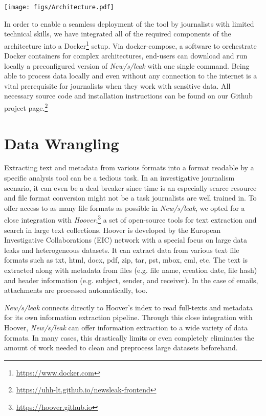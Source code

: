 \documentclass[11pt,a4paper]{article}
\begin{document}
    \begin{figure*}
    \centering
	\texttt{[image: figs/Architecture.pdf]}
	\caption{Architecture of \emph{New/s/leak 2.0}}
	\label{fig:arch} 
	\end{figure*}
	
In order to enable a seamless deployment of the tool by journalists with limited technical skills, we have integrated all of the required components of the architecture into a Docker\footnote{\url{https://www.docker.com}} setup. Via docker-compose, a software to orchestrate Docker containers for complex architectures, end-users can download and run locally a preconfigured version of \emph{New/s/leak} with one single command. Being able to process data locally and even without any connection to the internet is a vital prerequisite for journalists when they work with sensitive data. All necessary source code and installation instructions can be found on our Github project page.\footnote{\url{https://uhh-lt.github.io/newsleak-frontend}}


\section{Data Wrangling}
\label{sec:data_wrangling}

Extracting text and metadata from various formats into a format readable by a specific analysis tool can be a tedious task. In an investigative journalism scenario, it can even be a deal breaker since time is an especially scarce resource and file format conversion might not be a task journalists are well trained in. 
To offer access to as many file formats as possible in \emph{New/s/leak}, we opted for a close integration with \emph{Hoover},\footnote{\url{https://hoover.github.io}} a set of open-source tools for text extraction and search in large text collections. Hoover is developed by the European Investigative Collaborations (EIC) network with a special focus on large data leaks and heterogeneous datasets. It can extract data from various text file formats such as txt, html, docx, pdf, zip, tar, pst, mbox, eml, etc. The text is extracted along with metadata from files (e.g. file name, creation date, file hash) and header information (e.g. subject, sender, and receiver). In the case of emails, attachments are processed automatically, too.

\emph{New/s/leak} connects directly to Hoover's index to read full-texts and metadata for its own information extraction pipeline. Through this close integration with Hoover, \emph{New/s/leak} can offer information extraction to a wide variety of data formats. In many cases, this drastically limits or even completely eliminates the amount of work needed to clean and preprocess large datasets beforehand.
\end{document}
